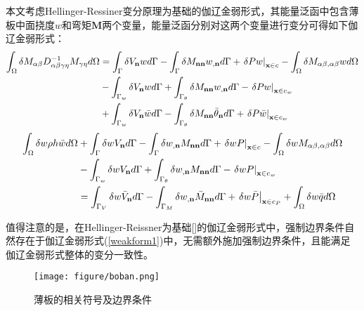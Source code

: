 \documentclass[a4paper]{article}
\begin{document}
本文考虑Hellinger-Ressiner变分原理为基础的伽辽金弱形式，其能量泛函中包含薄板中面挠度$w$和弯矩$\boldsymbol M$两个变量，能量泛函分别对这两个变量进行变分可得如下伽辽金弱形式：
\begin{equation}\label{weakform1}
    \begin{split}
        \int_\Omega {\delta {M_{\alpha \beta }}D_{\alpha \beta \gamma \eta }^{ - 1}{M_{\gamma \eta }}d\Omega }&=\int_\Gamma  {\delta {V_{\bf{n}}}wd\Gamma }  - \int_\Gamma  {\delta {M_{{\bf{nn}}}}{w_{,{\bf{n}}}}d\Gamma }+{\left. {\delta Pw} \right|_{{\bf{x}} \in c}} - \int_\Omega  {\delta {M_{\alpha \beta ,\alpha \beta }}wd\Omega } \\
        &-\int_{{\Gamma _w}} {\delta {V_{\bf{n}}}wd\Gamma }  + \int_{{\Gamma _\theta }} {\delta {M_{{\bf{nn}}}}{w_{,{\bf{n}}}}d\Gamma }  - {\left. {\delta Pw} \right|_{{\bf{x}} \in {c_w}}}\\
        &+\int_{{\Gamma _w}} {\delta {V_{\bf{n}}}\bar wd\Gamma }  - \int_{{\Gamma _\theta }} {\delta {M_{{\bf{nn}}}}{{\bar \theta }_{\bf{n}}}d\Gamma }  + {\left. {\delta P\bar w} \right|_{{\bf{x}} \in {c_w}}}
    \end{split}
\end{equation}
\begin{equation}
        \begin{split}
            \int_{\Omega}\delta w\rho h\ddot{w}d\Omega &+ \int_\Gamma  {\delta w{V_{\bf{n}}}d\Gamma } - \int_\Gamma  {\delta {w_{,{\bf{n}}}}{M_{{\bf{nn}}}}d\Gamma }  + {\left. {\delta wP} \right|_{{\bf{x}} \in c}} - \int_\Omega  {\delta w{M_{\alpha \beta ,\alpha\beta}}d\Omega }\\
            &- \int_{{\Gamma _w}} {\delta w{V_{\bf{n}}}d\Gamma }  + \int_{{\Gamma _\theta }} {\delta {w_{,{\bf{n}}}}{M_{{\bf{nn}}}}d\Gamma }  - {\left. {\delta wP} \right|_{{\bf{x}} \in {c_w}}}\\
            &= \int_{{\Gamma _V}} {\delta w{{\bar V}_{\bf{n}}}d\Gamma }  - \int_{{\Gamma _M}} {\delta {w_{,{\bf{n}}}}{{\bar M}_{{\bf{nn}}}}d\Gamma }  + {\left. {\delta w\bar P} \right|_{{\bf{x}} \in {c_P}}} + \int_\Omega  {\delta w\bar qd\Omega} 
    \end{split}
\end{equation} \par
值得注意的是，在Hellinger-Reissner为基础[]的伽辽金弱形式中，强制边界条件自然存在于伽辽金弱形式(\ref{weakform1})中，无需额外施加强制边界条件，且能满足伽辽金弱形式整体的变分一致性。
\begin{figure}[!h]
    \centering
    \texttt{[image: figure/boban.png]}
    \caption{薄板的相关符号及边界条件}
\end{figure}\newpage
\end{document}
